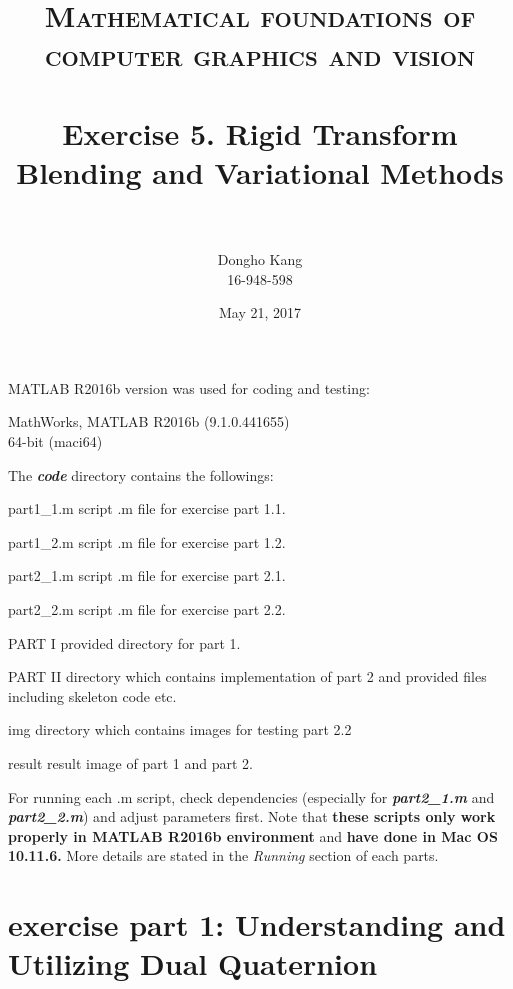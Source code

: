\documentclass[paper=a4, fontsize=11pt]{scrartcl} %
\title{	
\normalfont \normalsize 
\textsc{Mathematical foundations of computer graphics and vision} \\ [25pt] %
\horrule{0.5pt} \\[0.4cm] %
\huge Exercise 5. Rigid Transform Blending and Variational Methods\\ %
\horrule{2pt} \\[0.5cm] %
}
\author{Dongho Kang \\ \small 16-948-598} %
\date{\normalsize May 21, 2017} %
\numberwithin{equation}{section} %
\numberwithin{figure}{section} %
\numberwithin{table}{section} %
\newcommand{\filename}[1]{\textbf{\textit{#1}}}
\begin{document}
\maketitle %


MATLAB R2016b version was used for coding and testing:

\begin{center}
MathWorks, MATLAB R2016b (9.1.0.441655) \\
64-bit (maci64) 
\end{center}

The \filename{code} directory contains the followings:

\begin{filedescription}
	\item [part1\_1.m] script .m file for exercise part 1.1.
	\item [part1\_2.m] script .m file for exercise part 1.2.
	\item [part2\_1.m] script .m file for exercise part 2.1. 
	\item [part2\_2.m] script .m file for exercise part 2.2. 
	\item [PART I] provided directory for part 1.
	\item [PART II] directory which contains implementation of part 2 and provided files including skeleton code etc.
	\item [img] directory which contains images for testing part 2.2   
	\item [result] result image of part 1 and part 2.
\end{filedescription}

For running each .m script, check dependencies (especially for \filename{part2\_1.m} and \filename{part2\_2.m}) and adjust parameters first. Note that \textbf{these scripts only work properly in MATLAB R2016b environment} and \textbf{have done in Mac OS 10.11.6.} More details are stated in the \textit{Running} section of each parts.


\section{exercise part 1: Understanding and Utilizing Dual Quaternion}
\end{document}
